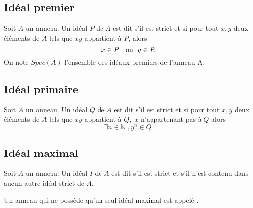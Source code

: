\subsection{Idéal premier}
\begin{madefinition}
	Soit $A$ un anneau. Un idéal $P$ de $A$ est dit  s'il est strict et si pour tout $x,y$ deux éléments de $A$ tels que $xy$ appartient à $P$, alors $$x \in P \text{ \; ou \;} y\in P.$$
	On note $Spec(A)$ l’ensemble des idéaux premiers de l'anneau A. 
\end{madefinition}
\subsection{Idéal primaire}
\begin{madefinition}
	Soit $A$ un anneau. Un idéal $Q$ de $A$ est dit  s'il est strict et si pour tout $x,y$ deux éléments de $A$ tels que $xy$ appartient à $Q, \; x$ n'appartenant pas à $Q $ alors $$\exists  n \in \mathbb{N} \;, y^{n} \in Q.$$
\end{madefinition}
\subsection{Idéal maximal}
\begin{madefinition}
	Soit $A$ un anneau. Un idéal $I$ de $A$ est dit  s'il est strict et s'il n'est contenu dans aucun autre idéal strict de $A$.
\end{madefinition}
\begin{maremarque}
	Un anneau qui ne possède qu'un seul idéal maximal est appelé .
\end{maremarque}
